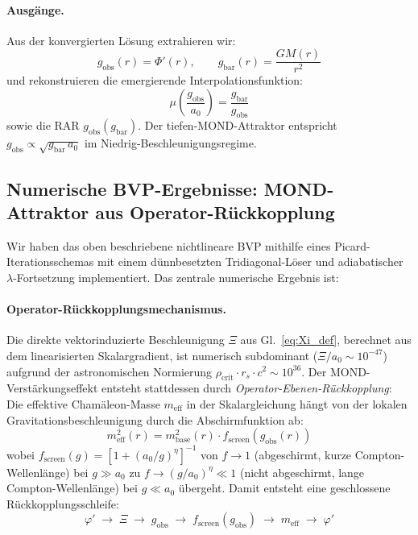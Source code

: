 \documentclass[aps,prd,twocolumn,superscriptaddress,nofootinbib]{revtex4-2}
\begin{document}
\paragraph{Ausg\"ange.}
Aus der konvergierten L\"osung extrahieren wir:
\begin{equation}
g_{\mathrm{obs}}(r) = \Phi'(r), \qquad g_{\mathrm{bar}}(r) = \frac{GM(r)}{r^2}
\end{equation}
und rekonstruieren die emergierende Interpolationsfunktion:
\begin{equation}
\mu\!\left(\frac{g_{\mathrm{obs}}}{a_0}\right) = \frac{g_{\mathrm{bar}}}{g_{\mathrm{obs}}}
\label{eq:mu_numerical}
\end{equation}
sowie die RAR $g_{\mathrm{obs}}(g_{\mathrm{bar}})$. Der tiefen-MOND-Attraktor entspricht $g_{\mathrm{obs}} \propto \sqrt{g_{\mathrm{bar}}\,a_0}$ im Niedrig-Beschleunigungsregime.

\subsection{Numerische BVP-Ergebnisse: MOND-Attraktor aus Operator-R\"uckkopplung}
\label{sec:bvp_results}

Wir haben das oben beschriebene nichtlineare BVP mithilfe eines Picard-Iterationsschemas mit einem d\"unnbesetzten Tridiagonal-L\"oser und adiabatischer $\lambda$-Fortsetzung implementiert. Das zentrale numerische Ergebnis ist:

\paragraph{Operator-R\"uckkopplungsmechanismus.}
Die direkte vektorinduzierte Beschleunigung $\Xi$ aus Gl.~\eqref{eq:Xi_def}, berechnet aus dem linearisierten Skalargradient, ist numerisch subdominant ($\Xi/a_0 \sim 10^{-47}$) aufgrund der astronomischen Normierung $\rho_{\mathrm{crit}} \cdot r_s \cdot c^2 \sim 10^{36}$. Der MOND-Verst\"arkungseffekt entsteht stattdessen durch \textit{Operator-Ebenen-R\"uckkopplung}: Die effektive Cham\"aleon-Masse $m_{\mathrm{eff}}$ in der Skalargleichung h\"angt von der lokalen Gravitationsbeschleunigung durch die Abschirmfunktion ab:
\begin{equation}
m_{\mathrm{eff}}^2(r) = m_{\mathrm{base}}^2(r) \cdot f_{\mathrm{screen}}\!\left(g_{\mathrm{obs}}(r)\right)
\label{eq:m_eff_feedback}
\end{equation}
wobei $f_{\mathrm{screen}}(g) = [1 + (a_0/g)^\eta]^{-1}$ von $f \to 1$ (abgeschirmt, kurze Compton-Wellenl\"ange) bei $g \gg a_0$ zu $f \to (g/a_0)^\eta \ll 1$ (nicht abgeschirmt, lange Compton-Wellenl\"ange) bei $g \ll a_0$ \"ubergeht. Damit entsteht eine geschlossene R\"uckkopplungsschleife:
\begin{equation}
\varphi' \;\to\; \Xi \;\to\; g_{\mathrm{obs}} \;\to\; f_{\mathrm{screen}}(g_{\mathrm{obs}}) \;\to\; m_{\mathrm{eff}} \;\to\; \varphi'
\end{equation}
\end{document}
